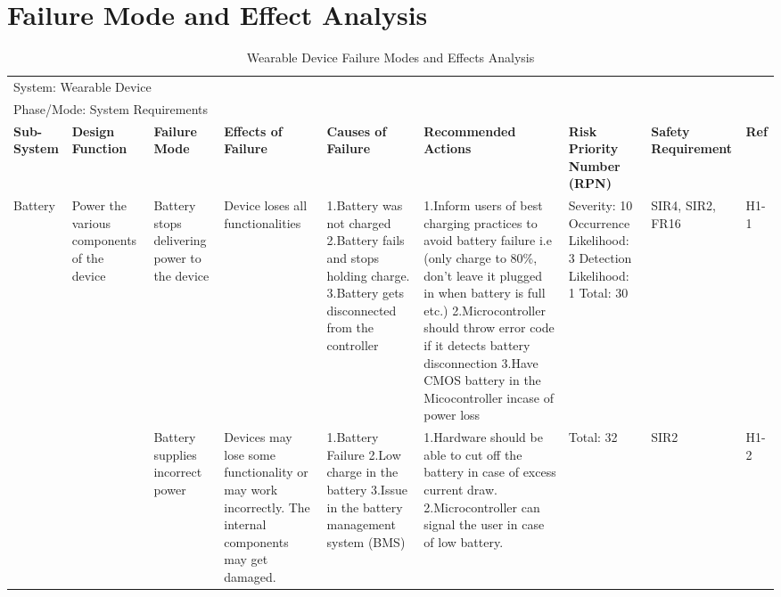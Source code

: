 \documentclass{article}
\begin{document}
\section{Failure Mode and Effect Analysis}
\hspace*{-1cm}
\begin{table}[H]
    \caption{Wearable Device Failure Modes and Effects Analysis}
    \tiny	
    \hspace*{-2.2cm}
    \begin{tabular}{| p{} | p{}  | p{} | p{} | p{} | p{} | p{} | p{} | p{} |}
    \hline
    
    \multicolumn{9}{|l|}{System: Wearable Device} \\
    \multicolumn{9}{|l|}{Phase/Mode: System Requirements} \\ \hline
    \textbf{Sub-System} & \textbf{Design Function} & \textbf{Failure Mode} & \textbf{Effects of Failure} & \textbf{Causes of Failure} & \textbf{Recommended Actions} & \textbf{Risk Priority Number (RPN)} & \textbf{Safety Requirement} & \textbf{Ref} \\ \hline

    Battery & Power the various components of the device  & Battery stops delivering power to the device & Device loses all functionalities & 1.Battery was not charged \newline 2.Battery fails and stops holding charge. \newline 3.Battery gets disconnected from the controller & 1.Inform users of best charging practices to avoid battery failure i.e (only charge to 80\%, don't leave it plugged in when battery is full etc.) \newline 2.Microcontroller should throw error code if it detects battery disconnection \newline 3.Have CMOS battery in the Micocontroller incase of power loss & Severity: 10 \newline Occurrence Likelihood: 3 \newline Detection Likelihood: 1 \newline Total: 30 & SIR4, SIR2, FR16 & H1-1 \\ \cline{3-9}
    
     & & Battery supplies incorrect power & Devices may lose some functionality or may work incorrectly. The internal components may get damaged. & 1.Battery Failure \newline 2.Low charge in the battery \newline 3.Issue in the battery management system (BMS) & 1.Hardware should be able to cut off the battery in case of excess current draw. \newline 2.Microcontroller can signal the user in case of low battery. & Total: 32 & SIR2 & H1-2 \\ \cline{3-9}


\end{tabular}
\end{table}
\end{document}
